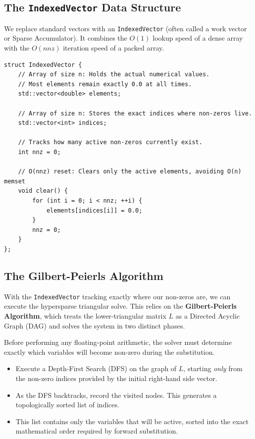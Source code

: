 \documentclass[11pt, a4paper]{article}
\begin{document}
\subsection{The \texttt{IndexedVector} Data Structure}

We replace standard vectors with an \texttt{IndexedVector} (often called a work vector or Sparse Accumulator). It combines the $O(1)$ lookup speed of a dense array with the $O(nnz)$ iteration speed of a packed array.

\begin{lstlisting}[caption={C++ Blueprint for an IndexedVector}]
struct IndexedVector {
    // Array of size n: Holds the actual numerical values.
    // Most elements remain exactly 0.0 at all times.
    std::vector<double> elements; 
    
    // Array of size n: Stores the exact indices where non-zeros live.
    std::vector<int> indices;     
    
    // Tracks how many active non-zeros currently exist.
    int nnz = 0;                  

    // O(nnz) reset: Clears only the active elements, avoiding O(n) memset
    void clear() {
        for (int i = 0; i < nnz; ++i) {
            elements[indices[i]] = 0.0;
        }
        nnz = 0;
    }
};
\end{lstlisting}

\subsection{The Gilbert-Peierls Algorithm}

With the \texttt{IndexedVector} tracking exactly where our non-zeros are, we can execute the hypersparse triangular solve. This relies on the \textbf{Gilbert-Peierls Algorithm}, which treats the lower-triangular matrix $L$ as a Directed Acyclic Graph (DAG) and solves the system in two distinct phases.

\begin{algostep}
Before performing any floating-point arithmetic, the solver must determine exactly which variables will become non-zero during the substitution.
\begin{itemize}[itemsep=2pt]
    \item Execute a Depth-First Search (DFS) on the graph of $L$, starting \emph{only} from the non-zero indices provided by the initial right-hand side vector.
    \item As the DFS backtracks, record the visited nodes. This generates a topologically sorted list of indices.
    \item This list contains only the variables that will be active, sorted into the exact mathematical order required by forward substitution.
\end{itemize}
\end{algostep}
\end{document}
